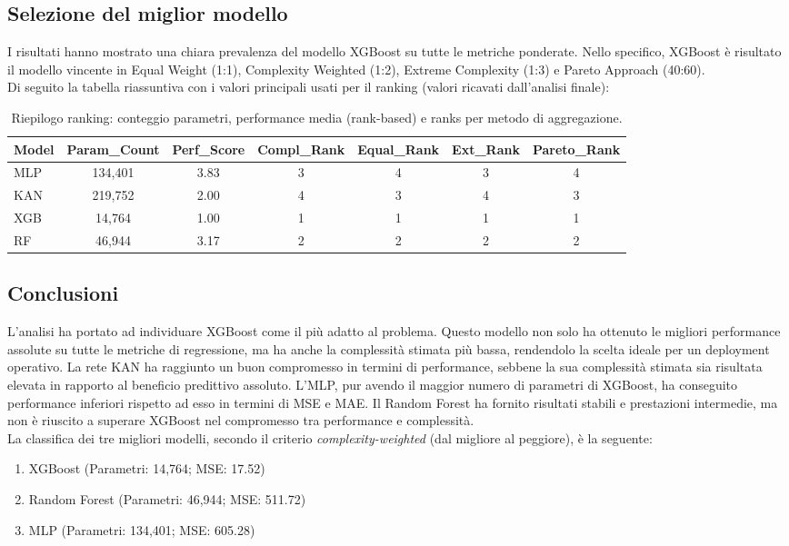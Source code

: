 \documentclass[a4paper,12pt]{report}
\begin{document}
	\subsection{Selezione del miglior modello}
	I risultati hanno mostrato una chiara prevalenza del modello XGBoost su tutte le metriche ponderate. Nello specifico, XGBoost è risultato il modello vincente in Equal Weight (1:1), Complexity Weighted (1:2), Extreme Complexity (1:3) e Pareto Approach (40:60). \\
	Di seguito la tabella riassuntiva con i valori principali usati per il ranking (valori ricavati dall'analisi finale):
	
	\begin{table}[H]
		\centering
		\setlength{\tabcolsep}{2pt}
		\small
		\begin{tabular}{lcccccc}
			\toprule
			\textbf{Model} & \textbf{Param\_Count} & \textbf{Perf\_Score} & \textbf{Compl\_Rank} & \textbf{Equal\_Rank} & \textbf{Ext\_Rank} & \textbf{Pareto\_Rank} \\
			\midrule
			MLP           & 134,401 & 3.83 & 3 & 4 & 3 & 4 \\
			KAN           & 219,752 & 2.00 & 4 & 3 & 4 & 3 \\
			XGB 		  & 14,764  & 1.00 & 1 & 1 & 1 & 1 \\
			RF 			  & 46,944  & 3.17 & 2 & 2 & 2 & 2 \\
			\bottomrule
		\end{tabular}
		\caption{Riepilogo ranking: conteggio parametri, performance media (rank-based) e ranks per metodo di aggregazione.}
	\end{table}
	
	\subsection{Conclusioni}
	L'analisi ha portato ad individuare XGBoost come il più adatto al problema. Questo modello non solo ha ottenuto le migliori performance assolute su tutte le metriche di regressione, ma ha anche la complessità stimata più bassa, rendendolo la scelta ideale per un deployment operativo. La rete KAN ha raggiunto un buon compromesso in termini di performance, sebbene la sua complessità stimata sia risultata elevata in rapporto al beneficio predittivo assoluto. L'MLP, pur avendo il maggior numero di parametri di XGBoost, ha conseguito performance inferiori rispetto ad esso in termini di MSE e MAE. Il Random Forest ha fornito risultati stabili e prestazioni intermedie, ma non è riuscito a superare XGBoost nel compromesso tra performance e complessità. \\
	La classifica dei tre migliori modelli, secondo il criterio \emph{complexity-weighted} (dal migliore al peggiore), è la seguente:
	\begin{enumerate}
		\item XGBoost (Parametri: 14,764; MSE: 17.52)
		\item Random Forest (Parametri: 46,944; MSE: 511.72)
		\item MLP (Parametri: 134,401; MSE: 605.28)
	\end{enumerate}
	
\end{document}
